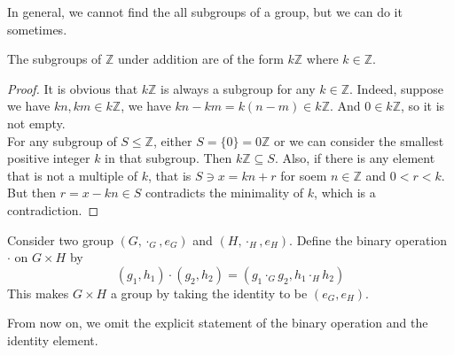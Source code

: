 In general, we cannot find the all subgroups of a group, but we can do it sometimes.
\begin{proposition}
    The subgroups of $\mathbb Z$ under addition are of the form $k\mathbb Z$ where $k\in\mathbb Z$.
\end{proposition}
\begin{proof}
    It is obvious that $k\mathbb Z$ is always a subgroup for any $k\in\mathbb Z$.
    Indeed, suppose we have $kn,km\in k\mathbb Z$, we have $kn-km=k(n-m)\in k\mathbb Z$.
    And $0\in k\mathbb Z$, so it is not empty.\\
    For any subgroup of $S\le\mathbb Z$, either $S=\{0\}=0\mathbb Z$ or we can consider the smallest positive integer $k$ in that subgroup.
    Then $k\mathbb Z\subseteq S$.
    Also, if there is any element that is not a multiple of $k$, that is $S\ni x=kn+r$ for soem $n\in\mathbb Z$ and $0<r<k$.
    But then $r=x-kn\in S$ contradicts the minimality of $k$, which is a contradiction.
\end{proof}
\begin{definition}
    Consider two group $(G,\cdot_G,e_G)$ and $(H,\cdot_H,e_H)$.
    Define the binary operation $\cdot$ on $G\times H$ by
    $$(g_1,h_1)\cdot (g_2,h_2)=(g_1\cdot_Gg_2,h_1\cdot_Hh_2)$$
    This makes $G\times H$ a group by taking the identity to be $(e_G,e_H)$.
\end{definition}
From now on, we omit the explicit statement of the binary operation and the identity element.
